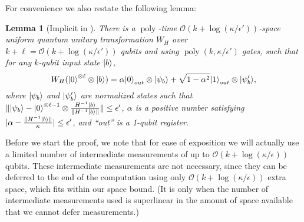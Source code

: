 \documentclass[11pt]{article}
\newtheorem{lemma}[theorem]{Lemma}
\theoremstyle{definition}
\theoremstyle{remark}
\newcommand\bigoh{\mathcal{O}}
\DeclareMathOperator{\poly}{poly}
\begin{document}
For convenience we also restate the following lemma:
\begingroup
\def\thelemma{\ref{lem: matrix inversion lemma}}
\begin{lemma}[Implicit in \cite{HHL,tashma}]
There is a $\poly$-time $\bigoh (k + \log(\kappa/\epsilon'))$-space uniform quantum unitary transformation $W_H$ over $k+\ell = \bigoh (k+ \log(\kappa/\epsilon'))$ qubits and using $\poly(k,\kappa/\epsilon')$ gates, such that for any $k$-qubit input state ${\left\vert{b}\right\rangle}$,
\begin{equation}
W_H ({\left\vert{0}\right\rangle}^{\otimes \ell} \otimes {\left\vert{b}\right\rangle}) = \alpha {\left\vert{0}\right\rangle}_{out} \otimes {\left\vert{\psi_b}\right\rangle} + \sqrt{1-\alpha^2} {\left\vert{1}\right\rangle}_{out} \otimes{\left\vert{\psi'_b}\right\rangle},
\end{equation}
where ${\left\vert{\psi_b}\right\rangle}$ and ${\left\vert{\psi'_b}\right\rangle}$ are normalized states such that $\| {\left\vert{\psi_b}\right\rangle} - {\left\vert{0}\right\rangle}^{\otimes \ell-1} \otimes \frac{H^{-1}{\left\vert{b}\right\rangle}} {\|H^{-1}{\left\vert{b}\right\rangle}\|} \| \le \epsilon'$, $\alpha$ is a positive number satisfying $|\alpha - \frac{\|H^{-1}{\left\vert{b}\right\rangle}\|}{\kappa}| \le \epsilon'$, and ``out'' is a 1-qubit register.
\end{lemma}
\addtocounter{theorem}{-1}
\endgroup

Before we start the proof, we note that for ease of exposition we will actually use a limited number of intermediate measurements of up to $\bigoh(k+\log(\kappa/\epsilon))$ qubits. These intermediate measurements are not necessary, since they can be deferred to the end of the computation using only $\bigoh(k+\log(\kappa/\epsilon))$ extra space, which fits within our space bound. (It is only when the number of intermediate measurements used is superlinear in the amount of space available that we cannot defer measurements.)
\end{document}
